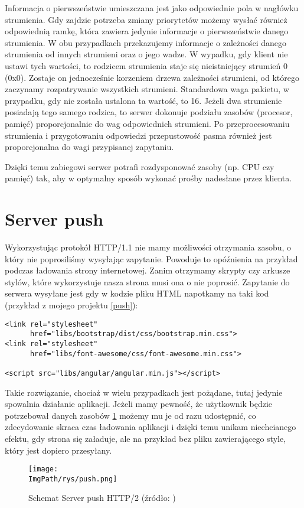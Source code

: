 \documentclass[a4paper,12pt,twoside,openany]{report}
\newcommand{\ImgPath}{.}
\begin{document}
Informacja o pierwszeństwie umieszczana jest jako odpowiednie pola w nagłówku strumienia.
Gdy zajdzie potrzeba zmiany priorytetów możemy wysłać również odpowiednią ramkę, która zawiera jedynie informacje o pierwszeństwie danego strumienia.
W obu przypadkach przekazujemy informacje o zależności danego strumienia od innych strumieni oraz o jego wadze.
W wypadku, gdy klient nie ustawi tych wartości, to rodzicem strumienia staje się nieistniejący strumień 0 (0x0).
Zostaje on jednocześnie korzeniem drzewa zależności strumieni, od którego zaczynamy rozpatrywanie wszystkich strumieni.
Standardowa waga pakietu, w przypadku, gdy nie została ustalona ta wartość, to 16.
Jeżeli dwa strumienie posiadają tego samego rodzica, to serwer dokonuje podziału zasobów (procesor, pamięć) proporcjonalnie do wag odpowiednich strumieni.
Po przeprocesowaniu strumienia i przygotowaniu odpowiedzi przepustowość pasma również jest proporcjonalna do wagi przypisanej zapytaniu.

Dzięki temu zabiegowi serwer potrafi rozdysponować zasoby (np. CPU czy pamięć) tak, aby w optymalny sposób wykonać prośby nadesłane przez klienta.

\section{Server push}
\label{sectionServerPush}

Wykorzystując protokół HTTP/1.1 nie mamy możliwości otrzymania zasobu, o który nie poprosiliśmy wysyłając zapytanie.
Powoduje to opóźnienia na przykład podczas ładowania strony internetowej.
Zanim otrzymamy skrypty czy arkusze stylów, które wykorzystuje nasza strona musi ona o nie poprosić.
Zapytanie do serwera wysyłane jest gdy w kodzie pliku HTML napotkamy na taki kod (przykład z mojego projektu \ref{push}):
\begin{lstlisting}[caption=Zasoby przesyłane z wykorzystaniem server push, label=push]
<link rel="stylesheet"
	  href="libs/bootstrap/dist/css/bootstrap.min.css">
<link rel="stylesheet"
      href="libs/font-awesome/css/font-awesome.min.css">

<script src="libs/angular/angular.min.js"></script>
\end{lstlisting}
Takie rozwiązanie, chociaż w wielu przypadkach jest pożądane, tutaj jedynie spowalnia działanie aplikacji.
Jeżeli mamy pewność, że użytkownik będzie potrzebował danych zasobów \ref{schematPush} możemy mu je od razu udostępnić, co zdecydowanie skraca czas ładowania aplikacji i dzięki temu unikam niechcianego efektu, gdy strona się załaduje, ale na przykład bez pliku zawierającego style, który jest dopiero przesyłany.
\begin{figure}[!htbp]
	\begin{center}
\centering
\texttt{[image: \\ImgPath/rys/push.png]}
\end{center}
	\caption{Schemat Server push HTTP/2 (źródło: \cite{http2Fundamentals})}
	\label{schematPush}
\end{figure}
\end{document}
